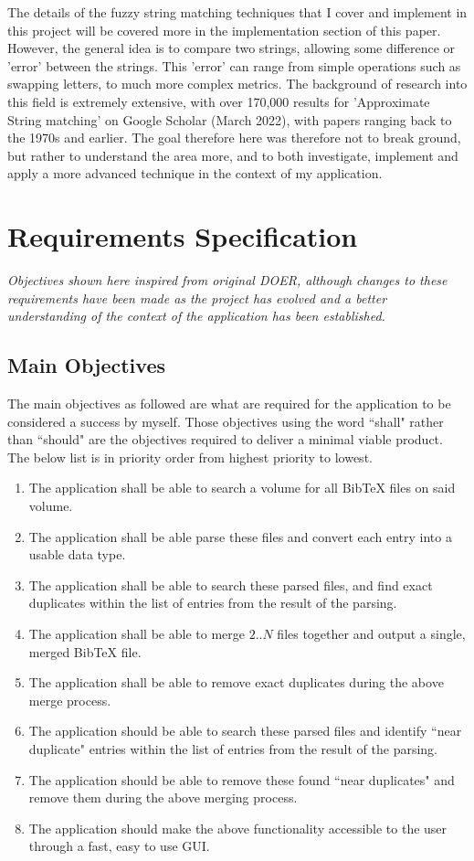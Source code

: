 \documentclass[a4paper,11pt]{article}
\begin{document}
The details of the fuzzy string matching techniques that I cover and implement in this project will be covered more in the implementation section of this paper. However, the general idea is to compare two strings, allowing some difference or 'error' between the strings. This 'error' can range from simple operations such as swapping letters, to much more complex metrics. The background of research into this field is extremely extensive, with over 170,000 results for 'Approximate String matching' on Google Scholar (March 2022), with papers ranging back to the 1970s and earlier. The goal therefore here was therefore not to break ground, but rather to understand the area more, and to both investigate, implement and apply a more advanced technique in the context of my application.

\section{Requirements Specification}
\textit{Objectives shown here inspired from original DOER, although changes to these requirements have been made as the project has evolved and a better understanding of the context of the application has been established.}

\subsection{Main Objectives}
The main objectives as followed are what are required for the application to be considered a success by myself. Those objectives using the word ``shall" rather than ``should" are the objectives required to deliver a minimal viable product. The below list is in priority order from highest priority to lowest.
\begin{enumerate}
    \item The application shall be able to search a volume for all BibTeX files on said volume.
    \item The application shall be able parse these files and convert each entry into a usable data type.
    \item The application shall be able to search these parsed files, and find exact duplicates within the list of entries from the result of the parsing.
    \item The application shall be able to merge $2..N$ files together and output a single, merged BibTeX file.
    \item The application shall be able to remove exact duplicates during the above merge process.
    \item The application should be able to search these parsed files and identify ``near duplicate" entries within the list of entries from the result of the parsing.
    \item The application should be able to remove these found ``near duplicates" and remove them during the above merging process.
    \item The application should make the above functionality accessible to the user through a fast, easy to use GUI.
\end{enumerate}
\end{document}
